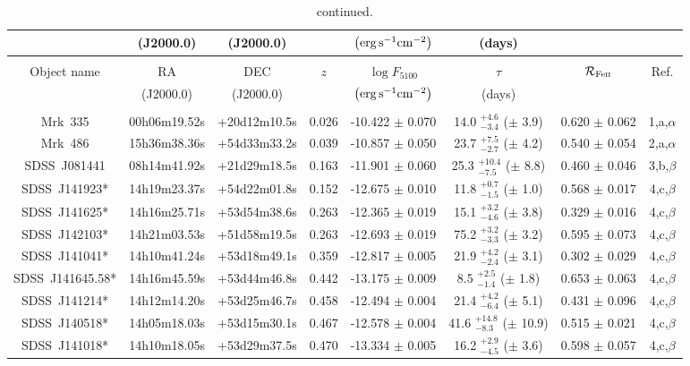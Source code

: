 \documentclass[a4paper,fleqn,usenatbib]{mnras}
\newcommand{\rfe}{${\cal R}_{\rm{Fe\textsc{ii}}}$}
\begin{document}
\begin{appendix}
\begin{longtable}{cccccccc}
& (J2000.0) & (J2000.0) & & $\left({\rm erg}\,{\rm s^{-1}}{\rm cm^{-2}}\right)$ & (days) & & \\
\hline
\endfirsthead
\caption{continued.}\\
\hline\hline
Object name &  RA & DEC & $z$ &  $\log F_{5100}$  &  $\tau$ & \rfe & Ref.  \\
& (J2000.0) & (J2000.0) & & $\left({\rm erg}\,{\rm s^{-1}}{\rm cm^{-2}}\right)$ & (days) & & \\
\hline
\endhead
\hline
\endfoot
\multicolumn{8}{c}{
Low \rfe\ sources, \rfe$\leq 0.655$} \\
\hline
Mrk~335 & 00h06m19.52s & +20d12m10.5s & 0.026 & -10.422 $\pm$ 0.070 & 14.0 $_{-3.4}^{+4.6}$ ($\pm$ 3.9) & 0.620 $\pm$ 0.062 & 1,a,$\alpha$ \\
Mrk~486 & 15h36m38.36s & +54d33m33.2s & 0.039 & -10.857 $\pm$ 0.050 & 23.7 $_{-2.7}^{+7.5}$ ($\pm$ 4.2) & 0.540 $\pm$ 0.054 & 2,a,$\alpha$ \\
SDSS~J081441 & 08h14m41.92s & +21d29m18.5s & 0.163 & -11.901 $\pm$ 0.060 & 25.3 $_{-7.5}^{+10.4}$ ($\pm$ 8.8) & 0.460 $\pm$ 0.046 & 3,b,$\beta$ \\
SDSS~J141923* & 14h19m23.37s & +54d22m01.8s & 0.152 & -12.675 $\pm$ 0.010 & 11.8 $_{-1.5}^{+0.7}$ ($\pm$ 1.0) & 0.568 $\pm$ 0.017 & 4,c,$\beta$ \\
SDSS~J141625* & 14h16m25.71s & +53d54m38.6s & 0.263 & -12.365 $\pm$ 0.019 & 15.1 $_{-4.6}^{+3.2}$ ($\pm$ 3.8) & 0.329 $\pm$ 0.016 & 4,c,$\beta$ \\
SDSS~J142103* & 14h21m03.53s & +51d58m19.5s & 0.263 & -12.693 $\pm$ 0.019 & 75.2 $_{-3.3}^{+3.2}$ ($\pm$ 3.2) & 0.595 $\pm$ 0.073 & 4,c,$\beta$ \\
SDSS~J141041* & 14h10m41.24s & +53d18m49.1s & 0.359 & -12.817 $\pm$ 0.005 & 21.9 $_{-2.4}^{+4.2}$ ($\pm$ 3.1) & 0.302 $\pm$ 0.029 & 4,c,$\beta$ \\
SDSS~J141645.58* & 14h16m45.59s & +53d44m46.8s & 0.442 & -13.175 $\pm$ 0.009 & 8.5 $_{-1.4}^{+2.5}$ ($\pm$ 1.8) & 0.653 $\pm$ 0.063 & 4,c,$\beta$ \\
SDSS~J141214* & 14h12m14.20s & +53d25m46.7s & 0.458 & -12.494 $\pm$ 0.004 & 21.4 $_{-6.4}^{+4.2}$ ($\pm$ 5.1) & 0.431 $\pm$ 0.096 & 4,c,$\beta$ \\
SDSS~J140518* & 14h05m18.03s & +53d15m30.1s & 0.467 & -12.578 $\pm$ 0.004 & 41.6 $_{-8.3}^{+14.8}$ ($\pm$ 10.9) & 0.515 $\pm$ 0.021 & 4,c,$\beta$ \\
SDSS~J141018* & 14h10m18.05s & +53d29m37.5s & 0.470 & -13.334 $\pm$ 0.005 & 16.2 $_{-4.5}^{+2.9}$ ($\pm$ 3.6) & 0.598 $\pm$ 0.057 & 4,c,$\beta$ \\

\end{longtable}
\end{appendix}
\end{document}
